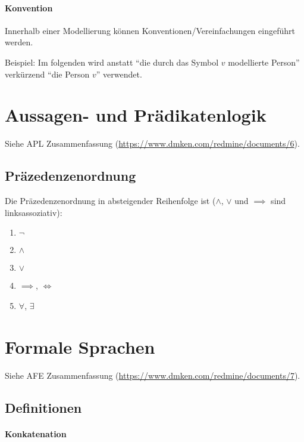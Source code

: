 		\paragraph{Konvention}
			Innerhalb einer Modellierung können Konventionen/Vereinfachungen eingeführt werden.

			Beispiel: Im folgenden wird anstatt \enquote{die durch das Symbol $ v $ modellierte Person} verkürzend \enquote{die Person $ v $} verwendet.

	\section{Aussagen- und Prädikatenlogik}
		Siehe APL Zusammenfassung (\url{https://www.dmken.com/redmine/documents/6}).

		\subsection{Präzedenzenordnung}
			Die Präzedenzenordnung in absteigender Reihenfolge ist ($ \land $, $ \lor $ und $ \implies $ sind linksassoziativ):
			\begin{enumerate}
				\item $ \lnot $
				\item $ \land $
				\item $ \lor $
				\item $ \implies $, $ \iff $
				\item $ \forall $, $ \exists $
			\end{enumerate}

	\section{Formale Sprachen}
		Siehe AFE Zusammenfassung (\url{https://www.dmken.com/redmine/documents/7}).

		\subsection{Definitionen}
			\paragraph{Konkatenation}


